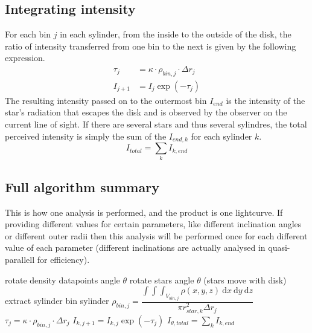\documentclass[a4paper, 12pt, english, titlepage]{article}
\newcommand{\D}[1]{\ \mathrm{d}#1} %
\begin{document}
\subsection{Integrating intensity}
    For each bin $j$ in each sylinder, from the inside to the outside of the disk, the ratio of intensity transferred from one bin to the next is given by the following expression.
    \begin{align*}
        \tau_j &= \kappa \cdot \rho_{bin,j} \cdot \Delta r_j \\
        I_{j+1} &= I_j \exp(-\tau_j)
    \end{align*}
    The resulting intensity passed on to the outermost bin $I_{end}$ is the intensity of the star's radiation that escapes the disk and is observed by the observer on the current line of sight. If there are several stars and thus several sylindres, the total perceived intensity is simply the sum of the $I_{end,k}$ for each sylinder $k$.
    $$
    I_{total} = \sum_k I_{k,end}
    $$

\subsection{Full algorithm summary}
    \label{sec:algorithm_summary}
    This is how one analysis is performed, and the product is one lightcurve. If providing different values for certain parameters, like different inclination angles or different outer radii then this analysis will be performed once for each different value of each parameter (different inclinations are actually analysed in quasi-parallell for efficiency).
    \begin{algorithmic}
            \STATE rotate density datapoints angle $\theta$
            \STATE rotate stars angle $\theta$ (stars move with disk)
                \STATE extract sylinder
                \STATE bin sylinder
                    \STATE $\rho_{bin,j} =
                        \dfrac{\int\int\int_{V_{bin,j}} \rho(x,y,z) \D{x}\D{y}\D{z}}
                        {\pi r_{star,k}^2 \Delta r_j}$
                    \STATE $\tau_j = \kappa \cdot \rho_{bin,j} \cdot \Delta r_j$
                    \STATE $I_{k,j+1} = I_{k,j} \exp(-\tau_j)$
                \ENDFOR
            \ENDFOR
            \STATE $I_{\theta,total} = \sum_k I_{k,end}$
        \ENDFOR
    \end{algorithmic}
\end{document}
